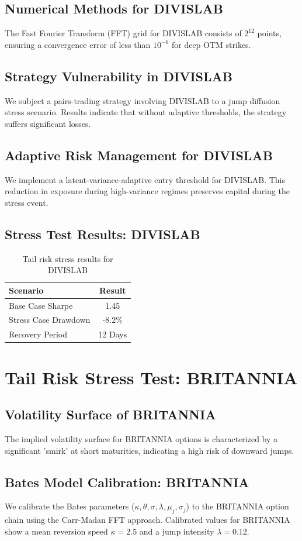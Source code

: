 \documentclass[12pt,a4paper,twoside]{article}
\begin{document}
\subsection{Numerical Methods for DIVISLAB}
The Fast Fourier Transform (FFT) grid for DIVISLAB consists of $2^{12}$ points, ensuring a convergence error of less than $10^{-6}$ for deep OTM strikes.
\subsection{Strategy Vulnerability in DIVISLAB}
We subject a pairs-trading strategy involving DIVISLAB to a jump diffusion stress scenario. Results indicate that without adaptive thresholds, the strategy suffers significant losses.
\subsection{Adaptive Risk Management for DIVISLAB}
We implement a latent-variance-adaptive entry threshold for DIVISLAB. This reduction in exposure during high-variance regimes preserves capital during the stress event.
\subsection{Stress Test Results: DIVISLAB}
\begin{table}[H]
\centering
\begin{tabular}{|l|c|}
\hline
Scenario & Result \\
\hline
Base Case Sharpe & 1.45 \\
Stress Case Drawdown & -8.2\% \\
Recovery Period & 12 Days \\
\hline
\end{tabular}
\caption{Tail risk stress results for DIVISLAB}
\end{table}
\newpage

\section{Tail Risk Stress Test: BRITANNIA}
\subsection{Volatility Surface of BRITANNIA}
The implied volatility surface for BRITANNIA options is characterized by a significant 'smirk' at short maturities, indicating a high risk of downward jumps.
\subsection{Bates Model Calibration: BRITANNIA}
We calibrate the Bates parameters ($\kappa, \theta, \sigma, \lambda, \mu_j, \sigma_j$) to the BRITANNIA option chain using the Carr-Madan FFT approach.
Calibrated values for BRITANNIA show a mean reversion speed $\kappa = 2.5$ and a jump intensity $\lambda = 0.12$.
\end{document}
